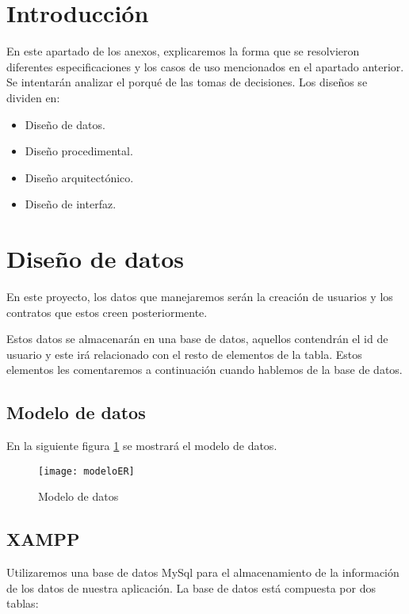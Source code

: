 
\section{Introducción}

En este apartado de los anexos, explicaremos la forma que se resolvieron diferentes especificaciones y los casos de uso mencionados en el apartado anterior. Se intentarán analizar el porqué de las tomas de decisiones. Los diseños se dividen en:

\begin{itemize}
	\item Diseño de datos.
	\item Diseño procedimental.
	\item Diseño arquitectónico.
	\item Diseño de interfaz.
\end{itemize}

\section{Diseño de datos}

En este proyecto, los datos que manejaremos serán la creación de usuarios y los contratos que estos creen posteriormente.

Estos datos se almacenarán en una base de datos, aquellos contendrán el id de usuario y este irá relacionado con el resto de elementos de la tabla. Estos elementos les comentaremos a continuación cuando hablemos de la base de datos.



\subsection{Modelo de datos}

En la siguiente figura \ref{fig:modelo} se mostrará el modelo de datos.

\begin{figure}[h!]
    \centering
    \texttt{[image: modeloER]}
    \caption{Modelo de datos}
    \label{fig:modelo}
\end{figure}



\subsection{XAMPP}

Utilizaremos una base de datos MySql para el almacenamiento de la información de los datos de nuestra aplicación. La base de datos está compuesta por dos tablas:

